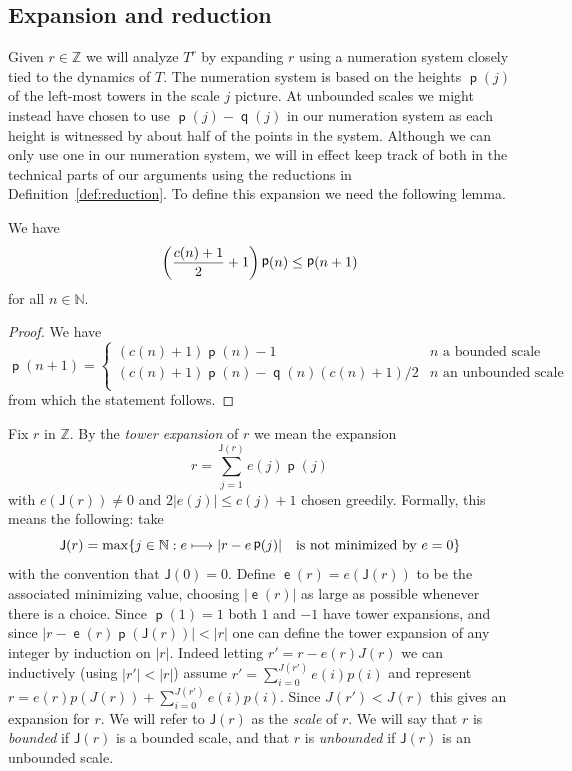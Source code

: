 \documentclass[AHL,Unicode,longabstracts,published]{cedram}
\DeclareMathOperator{\lst}{\mathsf{e}}
\DeclareMathOperator{\p}{\mathsf{p}}
\DeclareMathOperator{\q}{\mathsf{q}}
\newcommand{\N}{\mathbb{N}}
\newcommand{\Z}{\mathbb{Z}}
\newcommand{\scl}{\mathsf{J}}
\let\originalleft\left
\let\originalright\right
\renewcommand{\left}{\mathopen{}\mathclose\bgroup\originalleft}
\renewcommand{\right}{\aftergroup\egroup\originalright}
\let\oldmapsto\mapsto
\renewcommand*{\mapsto}{\mathchoice{\longmapsto}{\oldmapsto}{\oldmapsto}{\oldmapsto}}
\begin{document}
\subsection{Expansion and reduction}\label{subsec:expansion_reduction}
Given $r \in \Z$ we will analyze $T^r$ by expanding $r$ using a numeration system closely tied to the dynamics of $T$. The numeration system is based on the heights $\p(j)$ of the left-most towers in the scale $j$ picture. At unbounded scales we might instead have chosen to use $\p(j) - \q(j)$ in our numeration system as each height is witnessed by about half of the points in the system. Although we can only use one in our numeration system, we will in effect keep track of both in the technical parts of our arguments using the reductions in Definition~\ref{def:reduction}. To define this expansion we need the following lemma.

\begin{lemm}\label{lem:expansion_defined}
We have
\[
\left(\frac{c(n) + 1}{2} + 1 \right) \p(n) \le \p(n+1)
\]
for all $n \in \N$.
\end{lemm}
\begin{proof}
We have
\[
\p(n+1) =
\begin{cases}
(c(n) + 1) \p(n) - 1 & n \text{ a bounded scale} \\
(c(n) + 1) \p(n) - \q(n) (c(n)+1)/2 & n \text{ an unbounded scale} \\
\end{cases}
\]
from which the statement follows.
\end{proof}
\begin{defi}
Fix $r$ in $\Z$. By the
\emph{tower expansion} of $r$ we mean the expansion
\begin{equation}\label{eqn:rigidity_expan}
r = \sum_{j=1}^{\scl(r)} e(j) \p(j)
\end{equation}
with $e(\scl(r)) \ne 0$ and $2|e(j)| \le c(j)+1$ chosen greedily. Formally, this means the following: take
\[
\scl(r) =
\max
\left\{ j \in \N : e \mapsto |r - e \p(j)|\quad
\text{is not minimized by } e = 0
\right\}
\]
with the convention that $\scl(0) = 0$. Define $\lst(r) = e(\scl(r))$ to be the associated minimizing value, choosing $|\!\lst(r)|$ as large as possible whenever there is a choice. Since $\p(1) = 1$ both $1$ and $-1$ have tower expansions, and since $|r - \lst(r) \p(\scl(r))| < |r|$ one can define the tower expansion of any integer by induction on $|r|$. Indeed letting $r'=r-e(r)J(r)$ we can inductively (using $|r'|<|r|$) assume $r'=\sum_{i=0}^{J(r')}e(i)p(i)$ and represent $r=e(r)p(J(r))+\sum_{i=0}^{J(r')}e(i)p(i)$. Since $J(r')<J(r)$ this gives an expansion for $r$. We will refer to $\scl(r)$ as the
\emph{scale} of $r$. We will say that $r$ is
\emph{bounded} if $\scl(r)$ is a bounded scale, and that $r$ is
\emph{unbounded} if $\scl(r)$ is an unbounded scale.
\end{defi}
\end{document}
